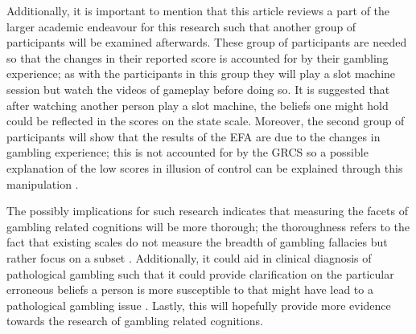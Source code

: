 \documentclass[twoside,twocolumn]{article}
\begin{document}
Additionally, it is important to mention that this article reviews a part of the larger academic endeavour for this research such that another group of participants will be examined afterwards. These group of participants are needed so that the changes in their reported score is accounted for by their gambling experience; as with the participants in this group they will play a slot machine session but watch the videos of gameplay before doing so. It is suggested that after watching another person play a slot machine, the beliefs one might hold could be reflected in the scores on the state scale. Moreover, the second group of participants will show that the results of the EFA are due to the changes in gambling experience; this is not accounted for by the GRCS so a possible explanation of the low scores in illusion of control can be explained through this manipulation \cite{raylu:2004}.

The possibly implications for such research indicates that measuring the facets of gambling related cognitions will be more thorough; the thoroughness refers to the fact that existing scales do not measure the breadth of gambling fallacies but rather focus on a subset \cite{Leonard:2015}. Additionally, it could aid in clinical diagnosis of pathological gambling such that it could provide clarification on the particular erroneous beliefs a person is more susceptible to that might have lead to a pathological gambling issue \cite{xian:2008, Ladouceur:2004}. Lastly, this will hopefully provide more evidence towards the research of gambling related cognitions.

\end{document}
